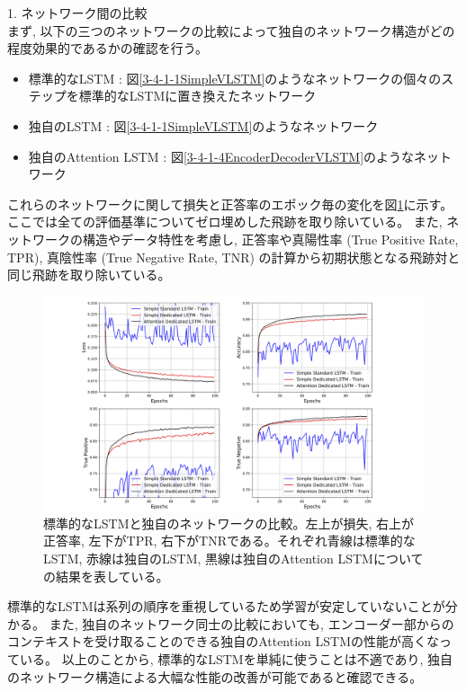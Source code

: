 1. ネットワーク間の比較\\

まず, 以下の三つのネットワークの比較によって独自のネットワーク構造がどの程度効果的であるかの確認を行う。

\begin{itemize}
 \item 標準的なLSTM : 図\ref{3-4-1-1SimpleVLSTM}のようなネットワークの個々のステップを標準的なLSTMに置き換えたネットワーク
 \item 独自のLSTM : 図\ref{3-4-1-1SimpleVLSTM}のようなネットワーク
 \item 独自のAttention LSTM : 図\ref{3-4-1-4EncoderDecoderVLSTM}のようなネットワーク
\end{itemize}

これらのネットワークに関して損失と正答率のエポック毎の変化を図\ref{3-4-3-1LSTMvsVLSTM}に示す。
ここでは全ての評価基準についてゼロ埋めした飛跡を取り除いている。
また, ネットワークの構造やデータ特性を考慮し, 正答率や真陽性率 (True Positive Rate, TPR), 真陰性率 (True Negative Rate, TNR) の計算から初期状態となる飛跡対と同じ飛跡を取り除いている。

\begin{figure}[htbp]
 \centering
 \includegraphics[trim = 100 0 100 0, width=1.0\textwidth, clip]{Figure/3Networks/3-4-3-1LSTMvsVLSTM.png}
 \caption[標準的なLSTMと独自のネットワークの比較]{標準的なLSTMと独自のネットワークの比較。左上が損失, 右上が正答率, 左下がTPR, 右下がTNRである。それぞれ青線は標準的なLSTM, 赤線は独自のLSTM, 黒線は独自のAttention LSTMについての結果を表している。}
 \label{3-4-3-1LSTMvsVLSTM}
\end{figure}

標準的なLSTMは系列の順序を重視しているため学習が安定していないことが分かる。
また, 独自のネットワーク同士の比較においても, エンコーダー部からのコンテキストを受け取ることのできる独自のAttention LSTMの性能が高くなっている。
以上のことから, 標準的なLSTMを単純に使うことは不適であり, 独自のネットワーク構造による大幅な性能の改善が可能であると確認できる。\\

